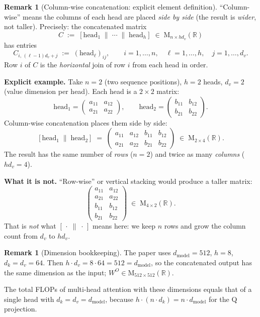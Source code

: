 \documentclass[11pt]{amsart}
\theoremstyle{plain}
\theoremstyle{definition}
\newtheorem{remark}[theorem]{Remark}
\newcommand{\R}{\mathbb{R}}
\newcommand{\Mat}[2]{\mathrm{M}_{#1 \times #2}(\R)}
\begin{document}
\begin{remark}[Column-wise concatenation: explicit element definition]
\label{rem:concat}
``Column-wise'' means the columns of each head are placed \emph{side by side}
(the result is \emph{wider}, not taller).  Precisely: the concatenated matrix
\[
    C \;:=\; [\mathrm{head}_1 \;\|\; \cdots \;\|\; \mathrm{head}_h]
    \;\in\; \Mat{n}{hd_v}
\]
has entries
\[
    C_{i,\,(\ell-1)d_v + j}
    \;:=\; (\mathrm{head}_\ell)_{ij},
    \qquad i=1,\ldots,n,\quad \ell=1,\ldots,h,\quad j=1,\ldots,d_v.
\]
Row $i$ of $C$ is the \emph{horizontal} join of row $i$ from each head in order.

\medskip
\textbf{Explicit example.}  Take $n=2$ (two sequence positions), $h=2$ heads,
$d_v=2$ (value dimension per head).  Each head is a $2\times 2$ matrix:
\[
    \mathrm{head}_1 = \begin{pmatrix} a_{11} & a_{12} \\ a_{21} & a_{22} \end{pmatrix},
    \qquad
    \mathrm{head}_2 = \begin{pmatrix} b_{11} & b_{12} \\ b_{21} & b_{22} \end{pmatrix}.
\]
Column-wise concatenation places them side by side:
\[
    [\mathrm{head}_1 \;\|\; \mathrm{head}_2]
    \;=\;
    \left(\begin{array}{cc|cc}
        a_{11} & a_{12} & b_{11} & b_{12} \\
        a_{21} & a_{22} & b_{21} & b_{22}
    \end{array}\right)
    \;\in\; \Mat{2}{4}.
\]
The result has the same number of \emph{rows} ($n=2$) and twice as many
\emph{columns} ($hd_v = 4$).

\medskip
\textbf{What it is not.}  ``Row-wise'' or vertical stacking would produce a
taller matrix:
\[
    \begin{pmatrix} a_{11} & a_{12} \\ a_{21} & a_{22} \\
                    b_{11} & b_{12} \\ b_{21} & b_{22} \end{pmatrix}
    \;\in\; \Mat{4}{2}.
\]
That is \emph{not} what $[\,\cdot\;\|\;\cdot\,]$ means here: we keep $n$ rows
and grow the column count from $d_v$ to $hd_v$.
\end{remark}

\begin{remark}[Dimension bookkeeping]
The paper uses $d_{\mathrm{model}} = 512$, $h = 8$, $d_k = d_v = 64$.
Then $h \cdot d_v = 8 \cdot 64 = 512 = d_{\mathrm{model}}$, so the concatenated
output has the same dimension as the input; $W^O \in \Mat{512}{512}$.

The total FLOPs of multi-head attention with these dimensions equals that of
a single head with $d_k = d_v = d_{\mathrm{model}}$, because
$h \cdot (n \cdot d_k) = n \cdot d_{\mathrm{model}}$ for the Q projection.
\end{remark}
\end{document}
